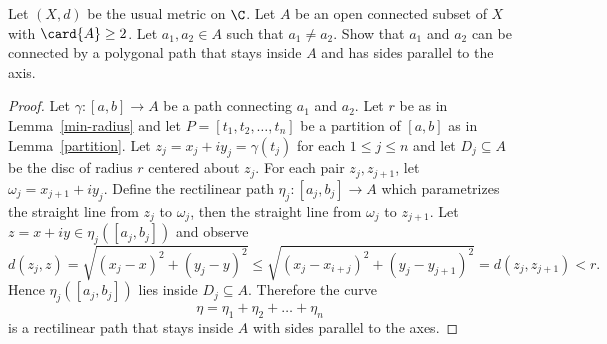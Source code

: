 \documentclass[12pt]{amsart}
\begin{document}
\begin{setup}
  Let $(X,d)$ be the usual metric on $\C$.
  Let $A$ be an open connected subset of $X$ with $\card{A} \geq 2$.
  Let $a_1, a_2 \in A$ such that $a_1 \not = a_2$.
  Show that $a_1$ and $a_2$ can be connected by a polygonal path that stays inside $A$ and has sides parallel to the axis.

  \begin{proof}
    Let $\gamma \colon [a,b] \rightarrow A$ be a path connecting $a_1$ and $a_2$.
    Let $r$ be as in Lemma~\ref{min-radius} and let $P = [t_1, t_2, \ldots, t_n]$ be a partition of $[a,b]$ as in Lemma~\ref{partition}.
    Let $z_j = x_j + iy_j = \gamma(t_j)$ for each $1 \leq j \leq n$ and let $D_j \subseteq A$ be the disc of radius $r$ centered about $z_j$.
    For each pair $z_j, z_{j+1}$, let $\omega_j = x_{j+1} + iy_j$.
    Define the rectilinear path $\eta_j : [a_j, b_j] \rightarrow A$ which parametrizes the straight line from $z_j$ to $\omega_j$, then the straight line from $\omega_j$ to $z_{j+1}$.
    Let $z = x + iy \in \eta_j([a_j, b_j])$ and observe 
    $$d(z_j, z) = \sqrt{(x_j - x)^2 + (y_j - y)^2} \leq \sqrt{(x_j - x_{i+j})^2 + (y_j - y_{j+1})^2} = d(z_j, z_{j+1}) < r.$$
    Hence $\eta_j([a_j, b_j])$ lies inside $D_j \subseteq A$.
    Therefore the curve $$\eta = \eta_1 + \eta_2 + \ldots + \eta_n$$ is a rectilinear path that stays inside $A$ with sides parallel to the axes.
    
  \end{proof}
\end{setup}
\end{document}
